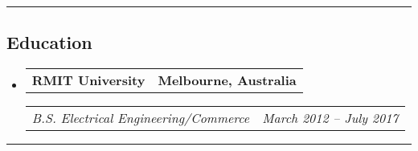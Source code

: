 \documentclass[11pt,letterpaper]{article}
\makeatletter
\newcommand{\headerrow}[2]
{\begin{tabular*}{\linewidth}{l@{\extracolsep{\fill}}r}
#1 &
#2 \\
\end{tabular*}}
\makeatother
\begin{document}
\hrule
\vspace{-1em}
\subsection*{\Large Education}

\begin{itemize}[leftmargin=1em]
	\parskip=0.1em
		
	\item
	      \headerrow
	      {\textbf{RMIT University}}
	      {\textbf{Melbourne, Australia}}
	      \headerrow
	      {\emph{B.S. Electrical Engineering/Commerce}}
	      {\emph{March 2012 -- July 2017}}
	      	      
\end{itemize}

\hrule
\vspace{-1em}
\end{document}
